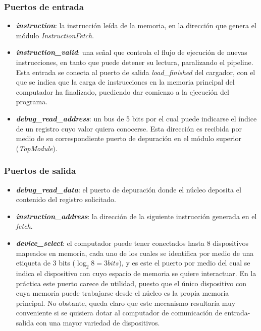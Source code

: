 \subsubsection{Puertos de entrada}
\begin{itemize}
  \item \textbf{\textit{instruction}}: la instrucción leída de la memoria, en la dirección que genera el módulo \textit{InstructionFetch}.
  \vspace{-0.2cm}
  \item \textbf{\textit{instruction\_valid}}: una señal que controla el flujo de ejecución de nuevas instrucciones, en tanto que puede detener su lectura, paralizando el pipeline. Esta entrada se conecta al puerto de salida \textit{load\_finished} del cargador, con el que se indica que la carga de instrucciones en la memoria principal del computador ha finalizado, puediendo dar comienzo a la ejecución del programa.
  \vspace{-0.2cm}
  \item \textbf{\textit{debug\_read\_address}}: un bus de 5 bits por el cual puede indicarse el índice de un registro cuyo valor quiera conocerse. Esta dirección es recibida por medio de su correspondiente puerto de depuración en el módulo superior (\textit{TopModule}).
\end{itemize}

\subsubsection{Puertos de salida}
\begin{itemize}
  \item \textbf{\textit{debug\_read\_data}}: el puerto de depuración donde el núcleo deposita el contenido del registro solicitado.
  \vspace{-0.2cm}
  \item \textbf{\textit{instruction\_address}}: la dirección de la siguiente instrucción generada en el \textit{fetch}.
  \vspace{-0.2cm}
  \item \textbf{\textit{device\_select}}: el computador puede tener conectados hasta 8 dispositivos mapeados en memoria, cada uno de los cuales se identifica por medio de una etiqueta de 3 bits ($\log_2 8 = 3 bits$), y es este el puerto por medio del cual se indica el dispositivo con cuyo espacio de memoria se quiere interactuar. En la práctica este puerto carece de utilidad, puesto que el único dispositivo con cuya memoria puede trabajarse desde el núcleo es la propia memoria principal. No obstante, queda claro que este mecanismo resultaría muy conveniente si se quisiera dotar al computador de comunicación de entrada-salida con una mayor variedad de dispositivos.
\end{itemize}


